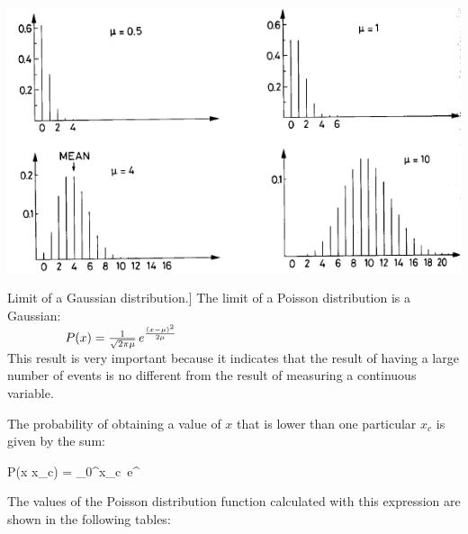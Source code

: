 	\bfi[H]
		\bc
			\includegraphics[width=.9\textwidth]{img/app42.png}\\
			\caption
				[Limit of a Gaussian distribution.]
				{The limit of a Poisson distribution is a Gaussian:\\
				${\color{white}.} \qquad {\color{white}.} \qquad P(x) = \frac{1}{\sqrt{2\pi\mu}} \,e^{\frac{(x - \mu)^2}{2\mu}} $\\
This result is very important because it indicates that the result of having a large number of events is no different from the result of measuring a continuous variable.}\label{fig:poisson}
		\ec
	\efi

The probability of obtaining a value of $x$ that is lower than one particular $x_c$ is given by the sum:

	\be P(x \leq x_c) = \sum_0^{x_c}  \,e^\mu \ee

The values ​​of the Poisson distribution function calculated with this expression are shown in the following tables:

